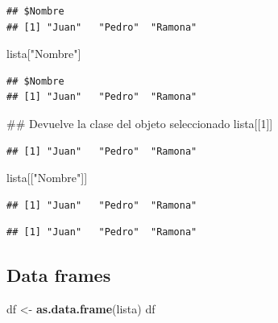 \documentclass[spanish,]{book}
\newenvironment{Shaded}{\begin{snugshade}}{\end{snugshade}}
\newcommand{\KeywordTok}[1]{\textcolor[rgb]{0.13,0.29,0.53}{\textbf{#1}}}
\newcommand{\DecValTok}[1]{\textcolor[rgb]{0.00,0.00,0.81}{#1}}
\newcommand{\StringTok}[1]{\textcolor[rgb]{0.31,0.60,0.02}{#1}}
\newcommand{\OperatorTok}[1]{\textcolor[rgb]{0.81,0.36,0.00}{\textbf{#1}}}
\newcommand{\NormalTok}[1]{#1}
\begin{document}
\begin{verbatim}
## $Nombre
## [1] "Juan"   "Pedro"  "Ramona"
\end{verbatim}

\begin{Shaded}
\begin{Highlighting}[]
\NormalTok{lista[}\StringTok{"Nombre"}\NormalTok{]}
\end{Highlighting}
\end{Shaded}

\begin{verbatim}
## $Nombre
## [1] "Juan"   "Pedro"  "Ramona"
\end{verbatim}

\begin{Shaded}
\begin{Highlighting}[]
\NormalTok{## Devuelve la clase del objeto seleccionado}
\NormalTok{lista[[}\DecValTok{1}\NormalTok{]]}
\end{Highlighting}
\end{Shaded}

\begin{verbatim}
## [1] "Juan"   "Pedro"  "Ramona"
\end{verbatim}

\begin{Shaded}
\begin{Highlighting}[]
\NormalTok{lista[[}\StringTok{"Nombre"}\NormalTok{]]}
\end{Highlighting}
\end{Shaded}

\begin{verbatim}
## [1] "Juan"   "Pedro"  "Ramona"
\end{verbatim}

\begin{Shaded}
\end{Shaded}

\begin{verbatim}
## [1] "Juan"   "Pedro"  "Ramona"
\end{verbatim}

\subsection{Data frames}\label{data-frames-1}

\begin{Shaded}
\begin{Highlighting}[]
\NormalTok{df <-}\StringTok{ }\KeywordTok{as.data.frame}\NormalTok{(lista)}
\NormalTok{df}
\end{Highlighting}
\end{Shaded}
\end{document}
